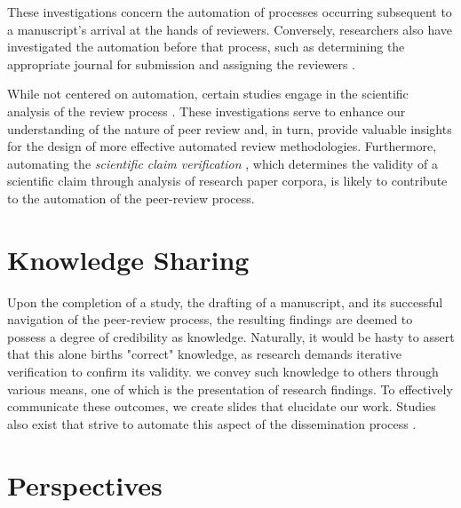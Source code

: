 \documentclass{book}
\begin{document}
These investigations concern the automation of processes occurring subsequent to a manuscript's arrival at the hands of reviewers. Conversely, researchers also have investigated the automation before that process, such as determining the appropriate journal for submission \cite{michail2023journal} and assigning the reviewers \cite{zhao2022reviewer}.

While not centered on automation, certain studies engage in the scientific analysis of the review process \cite{shah2022challenges,verma2021attend,bharti2022confident,bharti2022betterpr,verma2022lack,kennard2022disapere}. These investigations serve to enhance our understanding of the nature of peer review and, in turn, provide valuable insights for the design of more effective automated review methodologies. Furthermore, automating the \textit{scientific claim verification} \cite{li2019scientific,wadden2020fact,wadden2022scifact,wadden2022multivers}, which determines the validity of a scientific claim through analysis of research paper corpora, is likely to contribute to the automation of the peer-review process.

\section{Knowledge Sharing}

Upon the completion of a study, the drafting of a manuscript, and its successful navigation of the peer-review process, the resulting findings are deemed to possess a degree of credibility as knowledge. Naturally, it would be hasty to assert that this alone births "correct" knowledge, as research demands iterative verification to confirm its validity. we convey such knowledge to others through various means, one of which is the presentation of research findings. To effectively communicate these outcomes, we create slides that elucidate our work. Studies also exist that strive to automate this aspect of the dissemination process \cite{sefid2019automatic}.

\section{Perspectives}
\end{document}
